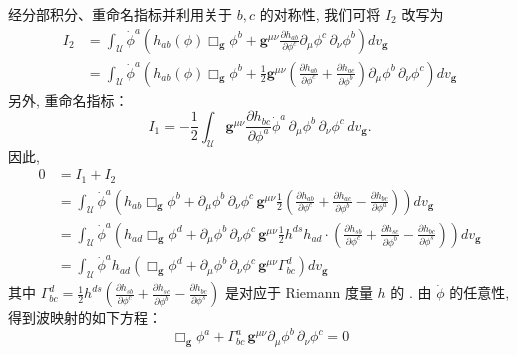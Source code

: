 经分部积分、重命名指标并利用关于 $b, c$ 的对称性, 我们可将 $I_2$ 改写为
\begin{equation}
\begin{aligned}
I_2 &= \int_{\mathcal{U}}\dot{\phi}^a\left(h_{ab}(\phi)\Box_{\mathbf{g}}\phi^b + \mathbf{g}^{\mu\nu}\frac{\partial h_{ab}}{\partial\phi^c}\partial_\mu\phi^c\, \partial_\nu\phi^b\right)dv_{\mathbf{g}}\\
&= \int_{\mathcal{U}}\dot{\phi}^a\left(h_{ab}(\phi)\Box_{\mathbf{g}}\phi^b + \frac{1}{2}\mathbf{g}^{\mu\nu}\left(\frac{\partial h_{ab}}{\partial\phi^c} + \frac{\partial h_{ac}}{\partial\phi^b}\right)\partial_\mu\phi^b\, \partial_\nu\phi^c\right)dv_{\mathbf{g}}
\end{aligned}\label{eq:c1-32}
\end{equation}
另外, 重命名指标：
\[
I_1 = -\frac{1}{2}\int_{\mathcal{U}}\mathbf{g}^{\mu\nu}\frac{\partial h_{bc}}{\partial\phi^a}\dot{\phi}^a\, \partial_\mu\phi^b\, \partial_\nu\phi^c\, dv_{\mathbf{g}}.
\]
因此, 
\[
\begin{aligned}
0 &= I_1 + I_2\\
&= \int_{\mathcal{U}}\dot{\phi}^a\left(h_{ab}\Box_{\mathbf{g}}\phi^b + \partial_\mu\phi^b\, \partial_\nu\phi^c\, \mathbf{g}^{\mu\nu}\frac{1}{2}\left(\frac{\partial h_{ab}}{\partial\phi^c} + \frac{\partial h_{ac}}{\partial\phi^b} - \frac{\partial h_{bc}}{\partial\phi^a}\right)\right)dv_{\mathbf{g}}\\
&= \int_{\mathcal{U}}\dot{\phi}^a\left(h_{ad}\Box_{\mathbf{g}}\phi^d + \partial_\mu\phi^b\, \partial_\nu\phi^c\, \mathbf{g}^{\mu\nu}\frac{1}{2}h^{ds}h_{ad}\cdot\left(\frac{\partial h_{sb}}{\partial\phi^c} + \frac{\partial h_{sc}}{\partial\phi^b} - \frac{\partial h_{bc}}{\partial\phi^s}\right)\right)dv_{\mathbf{g}}\\
&= \int_{\mathcal{U}}\dot{\phi}^a h_{ad}\left(\Box_{\mathbf{g}}\phi^d + \partial_\mu\phi^b\, \partial_\nu\phi^c\, \mathbf{g}^{\mu\nu}\Gamma^d_{bc}\right)dv_{\mathbf{g}}
\end{aligned}
\]
其中 $\Gamma^d_{bc} = \frac{1}{2}h^{ds}\left(\frac{\partial h_{sb}}{\partial\phi^c} + \frac{\partial h_{sc}}{\partial\phi^b} - \frac{\partial h_{bc}}{\partial\phi^s}\right)$ 是对应于 Riemann 度量 $h$ 的 . 由 $\dot{\phi}$ 的任意性, 得到波映射的如下方程：
\begin{equation}
\Box_{\mathbf{g}}\phi^a + \Gamma^a_{bc}\, \mathbf{g}^{\mu\nu}\partial_\mu\phi^b\, \partial_\nu\phi^c = 0\label{eq:c1-33}
\end{equation}

